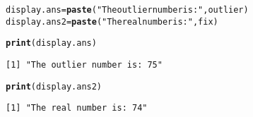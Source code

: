 \documentclass{article}\usepackage[]{graphicx}\usepackage[]{xcolor}
\makeatletter
\newcommand{\hlsng}[1]{\textcolor[rgb]{0.192,0.494,0.8}{#1}}%
\newcommand{\hldef}[1]{\textcolor[rgb]{0.345,0.345,0.345}{#1}}%
\newcommand{\hlkwb}[1]{\textcolor[rgb]{0.69,0.353,0.396}{#1}}%
\newcommand{\hlkwd}[1]{\textcolor[rgb]{0.737,0.353,0.396}{\textbf{#1}}}%
\newenvironment{kframe}{%
 \def\at@end@of@kframe{}%
 \ifinner\ifhmode%
  \def\at@end@of@kframe{\end{minipage}}%
  \begin{minipage}{\columnwidth}%
 \fi\fi%
 \def\FrameCommand##1{\hskip\@totalleftmargin \hskip-\fboxsep
 \colorbox{shadecolor}{##1}\hskip-\fboxsep
     \hskip-\linewidth \hskip-\@totalleftmargin \hskip\columnwidth}%
 \MakeFramed {\advance\hsize-\width
   \@totalleftmargin\z@ \linewidth\hsize
   \@setminipage}}%
 {\par\unskip\endMakeFramed%
 \at@end@of@kframe}
\newenvironment{knitrout}{}{} %
\makeatother
\begin{document}
\begin{enumerate}
\begin{knitrout}
\begin{kframe}
\begin{alltt}
\hldef{display.ans} \hlkwb{=} \hlkwd{paste}\hldef{(}\hlsng{"The outlier number is:"}\hldef{, outlier)}
\hldef{display.ans2} \hlkwb{=} \hlkwd{paste}\hldef{(}\hlsng{"The real number is:"}\hldef{, fix)}

\hlkwd{print}\hldef{(display.ans)}
\end{alltt}
\begin{verbatim}
[1] "The outlier number is: 75"
\end{verbatim}
\begin{alltt}
\hlkwd{print}\hldef{(display.ans2)}
\end{alltt}
\begin{verbatim}
[1] "The real number is: 74"
\end{verbatim}
\end{kframe}
\end{knitrout}
\end{enumerate}


\end{document}
